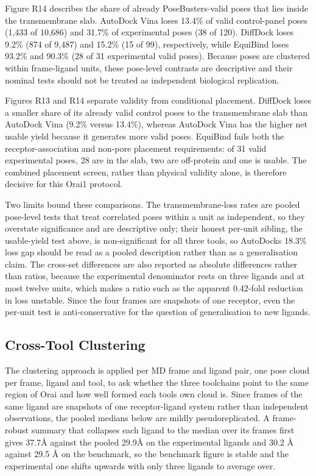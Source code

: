 Figure R14 describes the share of already PoseBusters-valid poses that lies inside the transmembrane slab. AutoDock Vina loses 13.4\% of valid control-panel poses (1,433 of 10,686) and 31.7\% of experimental poses (38 of 120). DiffDock loses 9.2\% (874 of 9,487) and 15.2\% (15 of 99), respectively, while EquiBind loses 93.2\% and 90.3\% (28 of 31 experimental valid poses). Because poses are clustered within frame-ligand units, these pose-level contrasts are descriptive and their nominal tests should not be treated as independent biological replication.

Figures R13 and R14 separate validity from conditional placement. DiffDock loses a smaller share of its already valid control poses to the transmembrane slab than AutoDock Vina (9.2\% versus 13.4\%), whereas AutoDock Vina has the higher net usable yield because it generates more valid poses. EquiBind fails both the receptor-association and non-pore placement requirements: of 31 valid experimental poses, 28 are in the slab, two are off-protein and one is usable. The combined placement screen, rather than physical validity alone, is therefore decisive for this Orai1 protocol.

Two limits bound these comparisons. The transmembrane-loss rates are pooled pose-level tests that treat correlated poses within a unit as independent, so they overstate significance and are descriptive only; their honest per-unit sibling, the usable-yield test above, is non-significant for all three tools, so AutoDock\textquotesingle s 18.3\% loss gap should be read as a pooled description rather than as a generalisation claim. The cross-set differences are also reported as absolute differences rather than ratios, because the experimental denominator rests on three ligands and at most twelve units, which makes a ratio such as the apparent 0.42-fold reduction in loss unstable. Since the four frames are snapshots of one receptor, even the per-unit test is anti-conservative for the question of generalisation to new ligands.

\hypertarget{cross-tool-clustering-1}{%
\subsection{Cross-Tool Clustering}\label{cross-tool-clustering-1}}

The clustering approach is applied per MD frame and ligand pair, one pose cloud per frame, ligand and tool, to ask whether the three toolchains point to the same region of Orai and how well formed each tool\textquotesingle s own cloud is. Since frames of the same ligand are snapshots of one receptor-ligand system rather than independent observations, the pooled medians below are mildly pseudoreplicated. A frame-robust summary that collapses each ligand to the median over its frames first gives 37.7Å against the pooled 29.9Å on the experimental ligands and 30.2 Å against 29.5 Å on the benchmark, so the benchmark figure is stable and the experimental one shifts upwards with only three ligands to average over.

